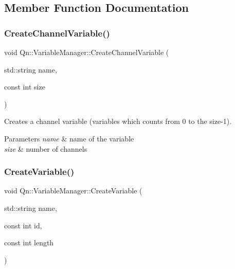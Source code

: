 \subsection{Member Function Documentation}
\mbox{\label{classQn_1_1VariableManager_a61883778476184c84fa02a6f3b55cea0}} 
\subsubsection{\texorpdfstring{Create\+Channel\+Variable()}{CreateChannelVariable()}}
{\footnotesize\ttfamily void Qn\+::\+Variable\+Manager\+::\+Create\+Channel\+Variable (\begin{DoxyParamCaption}\item[{std\+::string}]{name,  }\item[{const int}]{size }\end{DoxyParamCaption})\hspace{0.3cm}{\ttfamily [inline]}}



Creates a channel variable (variables which counts from 0 to the size-\/1). 


\begin{DoxyParams}{Parameters}
{\em name} & name of the variable \\
\hline
{\em size} & number of channels \\
\hline
\end{DoxyParams}
\mbox{\label{classQn_1_1VariableManager_a16091c43e9057525c4aee479f41fec43}} 
\subsubsection{\texorpdfstring{Create\+Variable()}{CreateVariable()}}
{\footnotesize\ttfamily void Qn\+::\+Variable\+Manager\+::\+Create\+Variable (\begin{DoxyParamCaption}\item[{std\+::string}]{name,  }\item[{const int}]{id,  }\item[{const int}]{length }\end{DoxyParamCaption})\hspace{0.3cm}{\ttfamily [inline]}}



